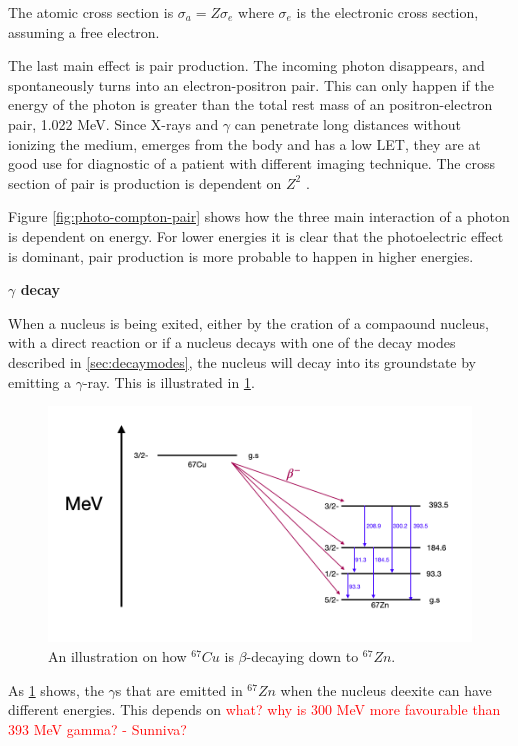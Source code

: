 \documentclass[twoside,english]{uiofysmaster/uiofysmaster}
\begin{document}
The atomic cross section is $\sigma_a = Z \sigma_e$ where $\sigma_e$ is the electronic cross section, assuming a free electron\cite{nuclearchem}.

The last main effect is pair production. The incoming photon disappears, and spontaneously turns into an electron-positron pair. This can only happen if the energy of the photon is greater than the total rest mass of an positron-electron pair, 1.022 MeV. Since X-rays and $\gamma$ can penetrate long distances without ionizing the medium, emerges from the body and has a low LET, they are at good use for diagnostic of a patient with different imaging technique. 
The cross section of pair is production is dependent on $Z^2$ .


Figure \ref{fig:photo-compton-pair} shows how the three main interaction of a photon is dependent on energy. For lower energies it is clear that the photoelectric effect is dominant, pair production is more probable to happen in higher energies.


\textbf{$\gamma$ decay}


When a nucleus is being exited, either by the cration of a compaound nucleus, with a direct reaction or if a nucleus decays with one of the decay modes described in \ref{sec:decaymodes}, the nucleus will decay into its groundstate by emitting a $\gamma$-ray. This is illustrated in \ref{fig:67cu_decay}.

\begin{figure}[h!]
    \centering
     \includegraphics[scale=0.4]{67Cu_decay.PNG}
     \caption{An illustration on how $^{67}Cu$ is $\beta$-decaying down to $^{67}Zn$. } 
    \label{fig:67cu_decay}
\end{figure}
\noindent
As \ref{fig:67cu_decay} shows, the $\gamma$s that are emitted in $^{67}Zn$ when the nucleus deexite can have different energies. This depends on \textcolor{red}{what? why is 300 MeV more favourable than 393 MeV gamma? - Sunniva?}
\end{document}
